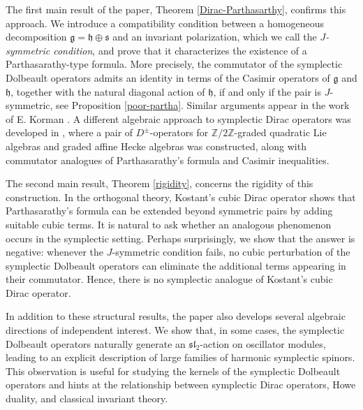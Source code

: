 \documentclass{amsart}[draft,11pt]
\numberwithin{equation}{section}
\theoremstyle{definition}
\begin{document}
\smallskip
The first main result of the paper, Theorem \ref{Dirac-Parthasarthy}, confirms this approach. We introduce a compatibility condition between a homogeneous decomposition $\mathfrak g=\mathfrak h\oplus\mathfrak s$ and an invariant polarization, which we call the \emph{$J$-symmetric condition}, and prove that it characterizes the existence of a Parthasarathy-type formula. More precisely,
the commutator of the symplectic Dolbeault operators admits an identity in terms of the Casimir operators of $\mathfrak g$ and $\mathfrak h$, together with the natural diagonal action of $\mathfrak h$, if and only if the pair is $J$-symmetric, see Proposition \ref{poor-partha}. Similar arguments appear in the work of E. Korman \cite{korman2013}. A different algebraic approach to symplectic Dirac operators was developed
in \cite{CMM2023}, where a pair of $D^{\pm}$-operators for $\mathbb{Z}/2\mathbb{Z}$-graded
quadratic Lie algebras and graded affine Hecke algebras was constructed, along with commutator analogues of Parthasarathy's formula
and Casimir inequalities.

\smallskip

The second main result, Theorem \ref{rigidity}, concerns the rigidity of this construction. In the orthogonal theory, Kostant's cubic Dirac operator shows that Parthasarathy's formula can be extended beyond symmetric pairs by adding suitable cubic terms. It is natural to ask whether an analogous phenomenon occurs in the symplectic setting. Perhaps surprisingly, we show that the answer is negative: whenever the $J$-symmetric condition fails, no cubic perturbation of the
symplectic Dolbeault operators can eliminate the additional terms appearing in their commutator. Hence, there is no symplectic analogue of Kostant's cubic Dirac operator.%

\smallskip
In addition to these structural results, the paper also develops several algebraic directions of independent interest. We show that, in some cases, the symplectic Dolbeault operators naturally generate an $\mathfrak{sl}_{2}$-action on oscillator modules, leading to an explicit description of large families of harmonic symplectic spinors. This observation is useful for studying the kernels of the symplectic Dolbeault operators and hints at the relationship between symplectic Dirac operators, Howe duality, and classical invariant theory.
\end{document}
